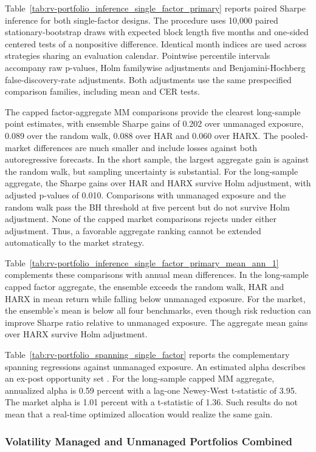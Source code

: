 \documentclass[preprint,12pt,authoryear]{elsarticle}
\begin{document}
Table~\ref{tab:rv-portfolio_inference_single_factor_primary} reports paired Sharpe inference for both single-factor designs. The procedure uses 10,000 paired stationary-bootstrap draws with expected block length five months and one-sided centered tests of a nonpositive difference. Identical month indices are used across strategies sharing an evaluation calendar. Pointwise percentile intervals accompany raw p-values, Holm familywise adjustments and Benjamini-Hochberg false-discovery-rate adjustments. Both adjustments use the same prespecified comparison families, including mean and CER tests.

The capped factor-aggregate MM comparisons provide the clearest long-sample point estimates, with ensemble Sharpe gains of 0.202 over unmanaged exposure, 0.089 over the random walk, 0.088 over HAR and 0.060 over HARX. The pooled-market differences are much smaller and include losses against both autoregressive forecasts. In the short sample, the largest aggregate gain is against the random walk, but sampling uncertainty is substantial. For the long-sample aggregate, the Sharpe gains over HAR and HARX survive Holm adjustment, with adjusted p-values of 0.010. Comparisons with unmanaged exposure and the random walk pass the BH threshold at five percent but do not survive Holm adjustment. None of the capped market comparisons rejects under either adjustment. Thus, a favorable aggregate ranking cannot be extended automatically to the market strategy.

Table~\ref{tab:rv-portfolio_inference_single_factor_primary_mean_ann_1} complements these comparisons with annual mean differences. In the long-sample capped factor aggregate, the ensemble exceeds the random walk, HAR and HARX in mean return while falling below unmanaged exposure. For the market, the ensemble's mean is below all four benchmarks, even though risk reduction can improve Sharpe ratio relative to unmanaged exposure. The aggregate mean gains over HARX survive Holm adjustment. 

Table~\ref{tab:rv-portfolio_spanning_single_factor} reports the complementary spanning regressions against unmanaged exposure. An estimated alpha describes an ex-post opportunity set \citep{cederburg2020}. For the long-sample capped MM aggregate, annualized alpha is 0.59 percent with a lag-one Newey-West t-statistic of 3.95. The market alpha is 1.01 percent with a t-statistic of 1.36. Such results do not mean that a real-time optimized allocation would realize the same gain.

\subsubsection{Volatility Managed and Unmanaged Portfolios Combined}
\end{document}

